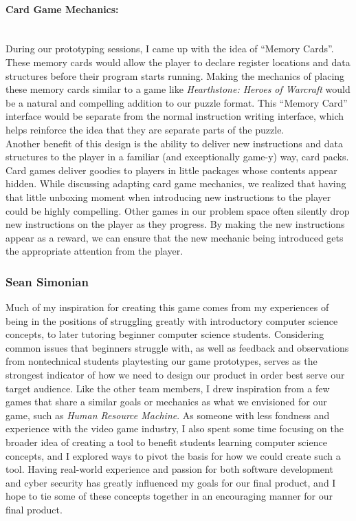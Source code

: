 \paragraph{Card Game Mechanics:} ~\\
During our prototyping sessions, I came up with the idea of “Memory Cards”.
These memory cards would allow the player to declare register locations and data
structures before their program starts running. Making the mechanics of placing these
memory cards similar to a game like \textit{Hearthstone: Heroes of Warcraft} would be
a natural and compelling addition to our puzzle format. This “Memory Card” interface
would be separate from the normal instruction writing interface, which helps reinforce
the idea that they are separate parts of the puzzle. \\

Another benefit of this design is the ability to deliver new instructions and data structures
to the player in a familiar (and exceptionally game-y) way, card packs. Card games deliver
goodies to players in little packages whose contents appear hidden. While discussing adapting
card game mechanics, we realized that having that little unboxing moment when introducing new
instructions to the player could be highly compelling. Other games in our problem space often
silently drop new instructions on the player as they progress. By making the new instructions
appear as a reward, we can ensure that the new mechanic being introduced gets the appropriate
attention from the player. \\




\subsubsection{Sean Simonian}

Much of my inspiration for creating this game comes from my experiences of being in the positions of struggling greatly with introductory computer science concepts, to later tutoring beginner computer science students.
Considering common issues that beginners struggle with, as well as feedback and observations from nontechnical students playtesting our game prototypes, serves as the strongest indicator of how we need to design our product in order best serve our target audience.
Like the other team members, I drew inspiration from a few games that share a similar goals or mechanics as what we envisioned for our game, such as \textit{Human Resource Machine}.
As someone with less fondness and experience with the video game industry, I also spent some time focusing on the broader idea of creating a tool to benefit students learning computer science concepts, and I explored ways to pivot the basis for how we could create such a tool.
Having real-world experience and passion for both software development and cyber security has greatly influenced my goals for our final product, and I hope to tie some of these concepts together in an encouraging manner for our final product.


